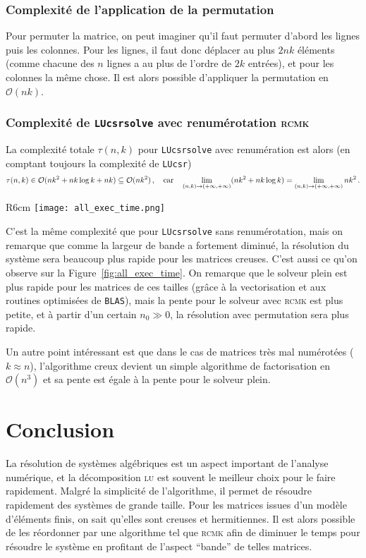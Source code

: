 \documentclass[11pt]{article}
\begin{document}
\subsubsection{Complexité de l'application de la permutation}
Pour permuter la matrice, on peut imaginer qu'il faut permuter d'abord les lignes puis les colonnes. Pour les lignes, il faut donc déplacer au plus $2nk$ éléments (comme chacune des $n$ lignes a au plus de l'ordre de $2k$ entrées), et pour les colonnes la même chose.
Il est alors possible d'appliquer la permutation en $\mathcal{O}(nk)$.
\subsubsection{Complexité de \texttt{LUcsrsolve} avec renumérotation \textsc{rcmk}}
La complexité totale $\tau(n, k)$ pour \lstinline|LUcsrsolve| avec renumération est alors (en comptant toujours la complexité de \lstinline|LUcsr|)
\[
\tau(n, k) \in \mathcal{O}(nk^2 + nk \log k + nk) \subseteq \mathcal{O}(nk^2)\,,\quad \textnormal{car} \quad \lim_{(n, k) \to (+\infty, +\infty)} (nk^2 + nk \log k) = \lim_{(n, k) \to (+\infty, +\infty)} nk^2\,.
\]
\begin{wrapfigure}{R}{6cm}
	\centering
	\texttt{[image: all\_exec\_time.png]}
	\caption{Temps d'exécution pour les différents solveurs.}
	\label{fig:all_exec_time}
\end{wrapfigure}
C'est la même complexité que pour \lstinline|LUcsrsolve| sans renumérotation, mais on remarque que comme la largeur de bande a fortement diminué, la résolution du système sera beaucoup plus rapide pour les matrices creuses.
C'est aussi ce qu'on observe sur la Figure~\ref{fig:all_exec_time}.
On remarque que le solveur plein est plus rapide pour les matrices de ces tailles (grâce à la vectorisation et aux routines optimisées de \lstinline[language=bash]|BLAS|), mais la pente pour le solveur avec \textsc{rcmk} est plus petite, et à partir d'un certain $n_0 \gg 0$, la résolution avec permutation sera plus rapide.

Un autre point intéressant est que dans le cas de matrices très mal numérotées ($k \approx n$), l'algorithme creux devient un simple algorithme de factorisation en $\mathcal{O}(n^3)$ et sa pente est égale à la pente pour le solveur plein.

\section*{Conclusion}
La résolution de systèmes algébriques est un aspect important de l'analyse numérique, et la décomposition \textsc{lu} est souvent le meilleur choix pour le faire rapidement. Malgré la simplicité de l'algorithme, il permet de résoudre rapidement des systèmes de grande taille.
Pour les matrices issues d'un modèle d'éléments finis, on sait qu'elles sont creuses et hermitiennes. Il est alors possible de les réordonner par une algorithme tel que \textsc{rcmk} afin de diminuer le temps pour résoudre le système en profitant de l'aspect \foreignquote{french}{bande} de telles matrices.
\end{document}
